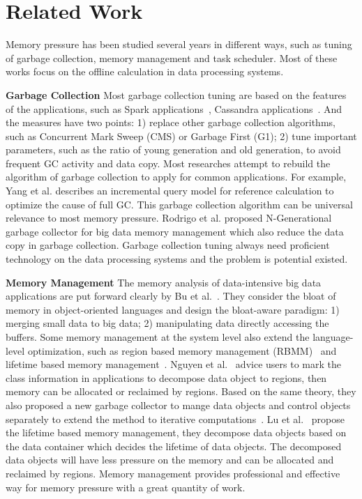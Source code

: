 \section{Related Work}

Memory pressure has been studied several years in different ways, such as tuning of garbage collection, memory management and task scheduler. Most of these works focus on the offline calculation in data processing systems. 

\textbf{Garbage Collection} Most garbage collection tuning are based on the features of the applications, such as Spark applications~\cite{www:spark-tuning}, Cassandra applications~\cite{www:cassandra}. And the measures have two points: 1) replace other garbage collection algorithms, such as Concurrent Mark Sweep (CMS) or Garbage First (G1); 2) tune important parameters, such as the ratio of young generation and old generation, to avoid frequent GC activity and data copy. Most researches attempt to rebuild the algorithm of garbage collection to apply for common applications. For example, Yang et al.\cite{yang:fullgc} describes an incremental query model for reference calculation to optimize the cause of full GC. This garbage collection algorithm can be universal relevance to most memory pressure. Rodrigo et al.\cite{rodigo:NGeneration} proposed N-Generational garbage collector for big data memory management which also reduce the data copy in garbage collection. Garbage collection tuning always need proficient technology on the data processing systems and the problem is potential existed.

\textbf{Memory Management} The memory analysis of data-intensive big data applications are put forward clearly by Bu et al.~\cite{bu:bloat}. They consider the bloat of memory in object-oriented languages and design the bloat-aware paradigm: 1) merging small data to big data; 2) manipulating data directly accessing the buffers. Some memory management at the system level also extend the language-level optimization, such as region based memory management (RBMM)~\cite{nguyen2015facade, nguyen:yak} and lifetime based memory management~\cite{lulu:deca}. Nguyen et al.~\cite{nguyen2015facade} advice users to mark the class information in applications to decompose data object to regions, then memory can be allocated or reclaimed by regions. Based on the same theory, they also proposed a new garbage collector to mange data objects and control objects separately to extend the method to iterative computations~\cite{nguyen:yak}. Lu et al.~\cite{lulu:deca} propose the lifetime based memory management, they decompose data objects based on the data container which decides the lifetime of data objects. The decomposed data objects will have less pressure on the memory and can be allocated and reclaimed by regions. Memory management provides professional and effective way for memory pressure with a great quantity of work.

